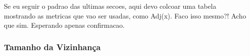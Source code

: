 Se eu seguir o padrao das ultimas secoes, aqui devo colcoar uma tabela mostrando as metricas que vao ser usadas, como Adj(x). Faco isso mesmo?! Acho que sim. Esperando apenas confirmacao.




\subsubsection{Tamanho da Vizinhança}
\label{subsubsection::neighborhoodsize}

